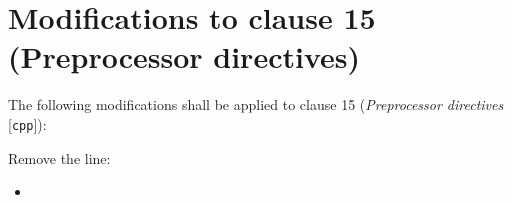 \section{Modifications to clause 15 (Preprocessor directives)}

The following modifications shall be applied to clause 15 (\emph{Preprocessor
directives} [\texttt{cpp}]):

\begin{modification}
Remove the line:

\begin{itemize}

\item
{}

\end{itemize}

\end{modification}
